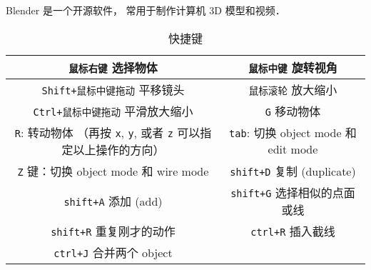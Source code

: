 
\begin{issues}
\issueDraft
\end{issues}

Blender 是一个开源软件， 常用于制作计算机 3D 模型和视频．

\begin{table}[ht]
\centering
\caption{快捷键}\label{Blendr_tab1}
\begin{tabular}{|c|c|}
\hline
\verb|鼠标右键| 选择物体 & \verb|鼠标中键| 旋转视角 \\
\hline
\verb|Shift+鼠标中键拖动| 平移镜头 & \verb|鼠标滚轮| 放大缩小 \\
\hline
\verb|Ctrl+鼠标中键拖动| 平滑放大缩小 & \verb|G| 移动物体 \\
\hline
\verb|R|: 转动物体 （再按 \verb|x|, \verb|y|, 或者 \verb|z| 可以指定以上操作的方向） & \verb|tab|: 切换 object mode 和 edit mode \\
\hline
\verb|Z| 键：切换 object mode 和 wire mode & \verb|shift+D| 复制 (duplicate) \\
\hline
\verb|shift+A| 添加 (add) & \verb|shift+G| 选择相似的点面或线 \\
\hline
\verb|shift+R| 重复刚才的动作 & \verb|ctrl+R| 插入截线 \\
\hline
\verb|ctrl+J| 合并两个 object & \\
\hline
\end{tabular}
\end{table}
